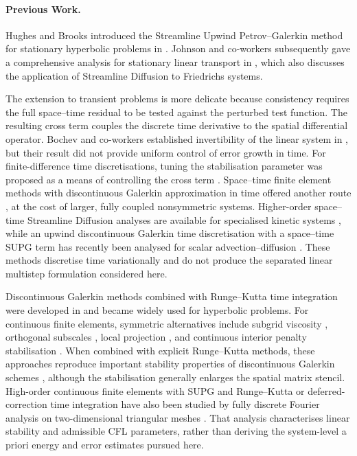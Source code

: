 \documentclass[11pt]{article}
\begin{document}
\noindent\begin{minipage}{\textwidth}
\paragraph{Previous Work.}
Hughes and Brooks introduced the Streamline Upwind Petrov--Galerkin method for
stationary hyperbolic problems in \cite{BrooksHughes1982CMAME}. Johnson and
co-workers subsequently gave a comprehensive analysis for stationary linear
transport in \cite{JNP84}, which also discusses the application of Streamline
Diffusion to Friedrichs systems.
\end{minipage}

The extension to transient problems is more delicate because consistency
requires the full space--time residual to be tested against the perturbed test
function. The resulting cross term couples the discrete time derivative to the
spatial differential operator. Bochev and co-workers established invertibility
of the linear system in \cite{BGS04}, but their result did not provide uniform
control of error growth in time. For finite-difference time discretisations,
tuning the stabilisation parameter was proposed as a means of controlling the
cross term \cite{LW95}. Space--time finite element methods with discontinuous
Galerkin approximation in time offered another route \cite{JNP84,HFH89}, at
the cost of larger, fully coupled nonsymmetric systems.
Higher-order space--time Streamline Diffusion analyses are available
for specialised kinetic systems \cite{AKS19}, while an upwind discontinuous
Galerkin time discretisation with a space--time SUPG term has recently been
analysed for scalar advection--diffusion \cite{BDG25}. These methods discretise
time variationally and do not produce the separated linear multistep
formulation considered here.

Discontinuous Galerkin methods combined with Runge--Kutta time integration
were developed in \cite{CS89} and became widely used for hyperbolic problems.
For continuous finite elements, symmetric alternatives include subgrid
viscosity \cite{Guer99}, orthogonal subscales \cite{Cod00}, local projection
\cite{BB04}, and continuous interior penalty stabilisation \cite{BH04}.
When combined with explicit Runge--Kutta methods, these approaches reproduce
important stability properties of discontinuous Galerkin schemes
\cite{BEF10}, although the stabilisation generally enlarges the spatial matrix
stencil.
High-order continuous finite elements with SUPG and Runge--Kutta or
deferred-correction time integration have also been studied by fully discrete
Fourier analysis on two-dimensional triangular meshes \cite{MTRA23}. That
analysis characterises linear stability and admissible CFL parameters, rather
than deriving the system-level a priori energy and error estimates pursued
here.
\end{document}

